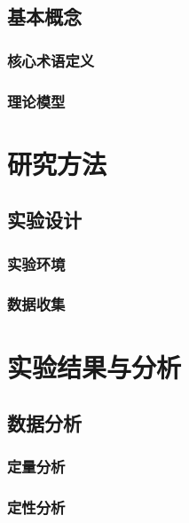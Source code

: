 \documentclass{USTBBook}
\begin{document}
\section{基本概念}
\zhlipsum[7]

\subsection{核心术语定义}
\zhlipsum[8]

\subsection{理论模型}
\zhlipsum[9]


\chapter{研究方法}
\zhlipsum[10]

\section{实验设计}
\zhlipsum[11]

\subsection{实验环境}
\zhlipsum[12]

\subsection{数据收集}
\zhlipsum[13]

\chapter{实验结果与分析}
\zhlipsum[14]

\section{数据分析}
\zhlipsum[15]

\subsection{定量分析}
\zhlipsum[16]

\subsection{定性分析}
\zhlipsum[17]
\end{document}
